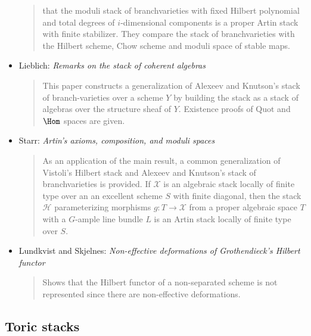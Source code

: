 \begin{itemize}
\begin{quote}
that the moduli stack of branchvarieties with fixed Hilbert polynomial and
total degrees of $i$-dimensional components is a proper Artin stack with
finite stabilizer. They compare the stack of branchvarieties with the
Hilbert scheme, Chow scheme and moduli space of stable maps.
\end{quote}
\item Lieblich: \emph{Remarks on the stack of coherent algebras}
\cite{lieblich_remarks}
\begin{quote}
This paper constructs a generalization of Alexeev and Knutson's stack of
branch-varieties over a scheme $Y$ by building the stack as a stack of
algebras over the structure sheaf of $Y$. Existence proofs of $\text{Quot}$
and $\Hom$ spaces are given.
\end{quote}
\item Starr: \emph{Artin's axioms, composition, and moduli spaces}
\cite{starr_artin}
\begin{quote}
As an application of the main result, a common generalization of Vistoli's
Hilbert stack \cite{vistoli_hilbert} and Alexeev and Knutson's stack of
branchvarieties \cite{alexeev-knutson} is provided. If $\mathcal{X}$ is
an algebraic stack locally of finite type over an an excellent scheme $S$
with finite diagonal, then the stack $\mathcal{H}$ parameterizing morphisms
$g: T \rightarrow \mathcal{X}$ from a proper algebraic space $T$ with a
$G$-ample line bundle $L$ is an Artin stack locally of finite type over $S$.
\end{quote}
\item Lundkvist and Skjelnes:
\emph{Non-effective deformations of Grothendieck's Hilbert functor}
\cite{lundkvist-skjelnes}
\begin{quote}
Shows that the Hilbert functor of a non-separated scheme is not represented
since there are non-effective deformations.
\end{quote}
\end{itemize}



\subsection{Toric stacks}
\label{subsection-toric}

